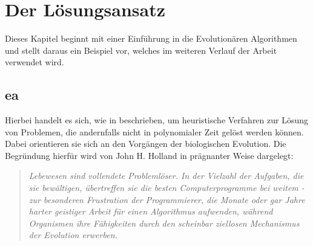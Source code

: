 \chapter{Der Lösungsansatz}
\label{sec:sol}

	Dieses Kapitel beginnt mit einer Einführung in die Evolutionären Algorithmen und stellt daraus ein Beispiel vor, welches im weiteren Verlauf der Arbeit verwendet wird.

	\section{\gls{ea}}
	\label{sec:evol}
	
		Hierbei handelt es sich, wie in \cite{ea-intro} beschrieben, um heuristische Verfahren zur Lösung von Problemen, die andernfalls nicht in polynomialer Zeit gelöst werden können. Dabei orientieren sie sich an den Vorgängen der biologischen Evolution. Die Begründung hierfür wird von John H. Holland \cite{j-h-holland} in prägnanter Weise dargelegt: 
	
		\begin{quote}
			\textit{Lebewesen sind vollendete Problemlöser. In der Vielzahl der Aufgaben, die sie bewältigen, übertreffen sie die besten Computerprogramme bei weitem - zur besonderen Frustration der Programmierer, die Monate oder gar Jahre harter geistiger Arbeit für einen Algorithmus aufwenden, während Organismen ihre Fähigkeiten durch den scheinbar ziellosen Mechanismus der Evolution erwerben.}
		\end{quote}
	
